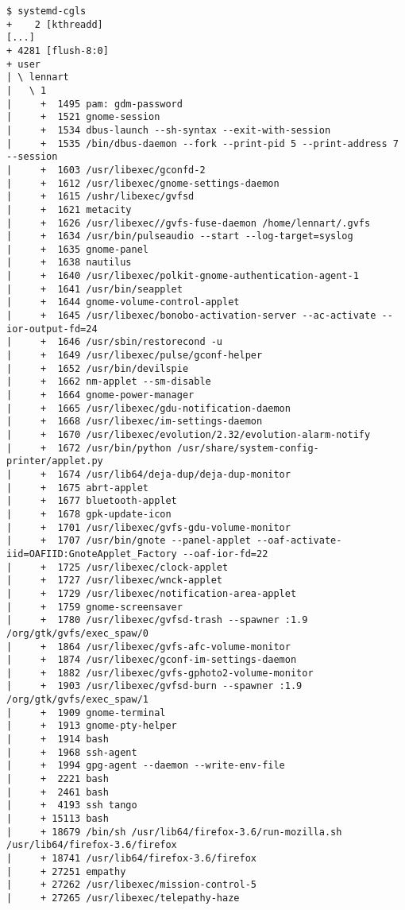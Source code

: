 \documentclass[10pt,oneside,a4paper]{article}
\begin{document}
\begin{landscape}
\begin{Verbatim}[fontsize=\small]
$ systemd-cgls
+    2 [kthreadd]
[...]
+ 4281 [flush-8:0]
+ user
| \ lennart
|   \ 1
|     +  1495 pam: gdm-password
|     +  1521 gnome-session
|     +  1534 dbus-launch --sh-syntax --exit-with-session
|     +  1535 /bin/dbus-daemon --fork --print-pid 5 --print-address 7 --session
|     +  1603 /usr/libexec/gconfd-2
|     +  1612 /usr/libexec/gnome-settings-daemon
|     +  1615 /ushr/libexec/gvfsd
|     +  1621 metacity
|     +  1626 /usr/libexec//gvfs-fuse-daemon /home/lennart/.gvfs
|     +  1634 /usr/bin/pulseaudio --start --log-target=syslog
|     +  1635 gnome-panel
|     +  1638 nautilus
|     +  1640 /usr/libexec/polkit-gnome-authentication-agent-1
|     +  1641 /usr/bin/seapplet
|     +  1644 gnome-volume-control-applet
|     +  1645 /usr/libexec/bonobo-activation-server --ac-activate --ior-output-fd=24
|     +  1646 /usr/sbin/restorecond -u
|     +  1649 /usr/libexec/pulse/gconf-helper
|     +  1652 /usr/bin/devilspie
|     +  1662 nm-applet --sm-disable
|     +  1664 gnome-power-manager
|     +  1665 /usr/libexec/gdu-notification-daemon
|     +  1668 /usr/libexec/im-settings-daemon
|     +  1670 /usr/libexec/evolution/2.32/evolution-alarm-notify
|     +  1672 /usr/bin/python /usr/share/system-config-printer/applet.py
|     +  1674 /usr/lib64/deja-dup/deja-dup-monitor
|     +  1675 abrt-applet
|     +  1677 bluetooth-applet
|     +  1678 gpk-update-icon
|     +  1701 /usr/libexec/gvfs-gdu-volume-monitor
|     +  1707 /usr/bin/gnote --panel-applet --oaf-activate-iid=OAFIID:GnoteApplet_Factory --oaf-ior-fd=22
|     +  1725 /usr/libexec/clock-applet
|     +  1727 /usr/libexec/wnck-applet
|     +  1729 /usr/libexec/notification-area-applet
|     +  1759 gnome-screensaver
|     +  1780 /usr/libexec/gvfsd-trash --spawner :1.9 /org/gtk/gvfs/exec_spaw/0
|     +  1864 /usr/libexec/gvfs-afc-volume-monitor
|     +  1874 /usr/libexec/gconf-im-settings-daemon
|     +  1882 /usr/libexec/gvfs-gphoto2-volume-monitor
|     +  1903 /usr/libexec/gvfsd-burn --spawner :1.9 /org/gtk/gvfs/exec_spaw/1
|     +  1909 gnome-terminal
|     +  1913 gnome-pty-helper
|     +  1914 bash
|     +  1968 ssh-agent
|     +  1994 gpg-agent --daemon --write-env-file
|     +  2221 bash
|     +  2461 bash
|     +  4193 ssh tango
|     + 15113 bash
|     + 18679 /bin/sh /usr/lib64/firefox-3.6/run-mozilla.sh /usr/lib64/firefox-3.6/firefox
|     + 18741 /usr/lib64/firefox-3.6/firefox
|     + 27251 empathy
|     + 27262 /usr/libexec/mission-control-5
|     + 27265 /usr/libexec/telepathy-haze

\end{Verbatim}
\end{landscape}
\end{document}
